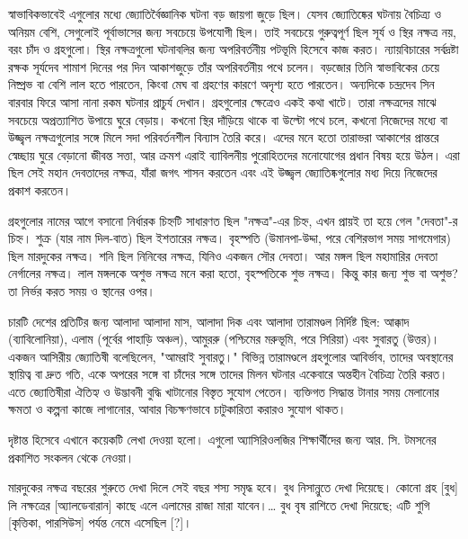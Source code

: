 স্বাভাবিকভাবেই এগুলোর মধ্যে জ্যোতির্বৈজ্ঞানিক ঘটনা বড় জায়গা জুড়ে ছিল। যেসব জ্যোতিষ্কের ঘটনায় বৈচিত্র্য ও অনিয়ম বেশি, সেগুলোই পূর্বাভাসের জন্য সবচেয়ে উপযোগী ছিল। তাই সবচেয়ে গুরুত্বপূর্ণ ছিল সূর্য ও স্থির নক্ষত্র নয়, বরং চাঁদ ও গ্রহগুলো। স্থির নক্ষত্রগুলো ঘটনাবলির জন্য অপরিবর্তনীয় পটভূমি হিসেবে কাজ করত। ন্যায়বিচারের সর্বদ্রষ্টা রক্ষক সূর্যদেব শামাশ দিনের পর দিন আকাশজুড়ে তাঁর অপরিবর্তনীয় পথে চলেন। বড়জোর তিনি স্বাভাবিকের চেয়ে নিষ্প্রভ বা বেশি লাল হতে পারতেন, কিংবা মেঘ বা গ্রহণের কারণে অদৃশ্য হতে পারতেন। অন্যদিকে চন্দ্রদেব সিন বারবার ফিরে আসা নানা রকম ঘটনার প্রাচুর্য দেখান। গ্রহগুলোর ক্ষেত্রেও একই কথা খাটে। তারা নক্ষত্রদের মাঝে সবচেয়ে অপ্রত্যাশিত উপায়ে ঘুরে বেড়ায়। কখনো স্থির দাঁড়িয়ে থাকে বা উল্টো পথে চলে, কখনো নিজেদের মধ্যে বা উজ্জ্বল নক্ষত্রগুলোর সঙ্গে মিলে সদা পরিবর্তনশীল বিন্যাস তৈরি করে। এদের মনে হতো তারাভরা আকাশের প্রান্তরে স্বেচ্ছায় ঘুরে বেড়ানো জীবন্ত সত্তা, আর ক্রমশ এরাই ব্যাবিলনীয় পুরোহিতদের মনোযোগের প্রধান বিষয় হয়ে উঠল। এরা ছিল সেই মহান দেবতাদের নক্ষত্র, যাঁরা জগৎ শাসন করতেন এবং এই উজ্জ্বল জ্যোতিষ্কগুলোর মধ্য দিয়ে নিজেদের প্রকাশ করতেন।

গ্রহগুলোর নামের আগে বসানো নির্ধারক চিহ্নটি সাধারণত ছিল "নক্ষত্র"-এর চিহ্ন, এখন প্রায়ই তা হয়ে গেল "দেবতা"-র চিহ্ন। শুক্র (যার নাম দিল-বাত) ছিল ইশতারের নক্ষত্র। বৃহস্পতি (উমানপা-উদ্দা, পরে বেশিরভাগ সময় সাগমেগার) ছিল মারদুকের নক্ষত্র। শনি ছিল নিনিবের নক্ষত্র, যিনিও একজন সৌর দেবতা। আর মঙ্গল ছিল মহামারির দেবতা নের্গালের নক্ষত্র। লাল মঙ্গলকে অশুভ নক্ষত্র মনে করা হতো, বৃহস্পতিকে শুভ নক্ষত্র। কিন্তু কার জন্য শুভ বা অশুভ? তা নির্ভর করত সময় ও স্থানের ওপর।

চারটি দেশের প্রতিটির জন্য আলাদা আলাদা মাস, আলাদা দিক এবং আলাদা তারামণ্ডল নির্দিষ্ট ছিল: আক্কাদ (ব্যাবিলোনিয়া), এলাম (পূর্বের পাহাড়ি অঞ্চল), আমুররু (পশ্চিমের মরুভূমি, পরে সিরিয়া) এবং সুবারতু (উত্তর)। একজন আসিরীয় জ্যোতিষী বলেছিলেন, "আমরাই সুবারতু।" বিভিন্ন তারামণ্ডলে গ্রহগুলোর আবির্ভাব, তাদের অবস্থানের স্থায়িত্ব বা দ্রুত গতি, একে অপরের সঙ্গে বা চাঁদের সঙ্গে তাদের মিলন ঘটনার একেবারে অন্তহীন বৈচিত্র্য তৈরি করত। এতে জ্যোতিষীরা ঐতিহ্য ও উদ্ভাবনী বুদ্ধি খাটানোর বিস্তৃত সুযোগ পেতেন। ব্যক্তিগত সিদ্ধান্ত টানার সময় মেলানোর ক্ষমতা ও কল্পনা কাজে লাগানোর, আবার বিচক্ষণভাবে চাটুকারিতা করারও সুযোগ থাকত।

দৃষ্টান্ত হিসেবে এখানে কয়েকটি লেখা দেওয়া হলো। এগুলো অ্যাসিরিওলজির শিক্ষার্থীদের জন্য আর. সি. টমসনের প্রকাশিত সংকলন থেকে নেওয়া।

মারদুকের নক্ষত্র বছরের শুরুতে দেখা দিলে সেই বছর শস্য সমৃদ্ধ হবে। বুধ নিসান্নুতে দেখা দিয়েছে। কোনো গ্রহ [বুধ] লি নক্ষত্রের [অ্যালডেবারান] কাছে এলে এলামের রাজা মারা যাবেন।… বুধ বৃষ রাশিতে দেখা দিয়েছে; এটি শুগি [কৃত্তিকা, পারসিউস] পর্যন্ত নেমে এসেছিল [?]।

